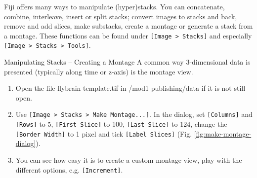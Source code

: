 Fiji offers many ways to manipulate (hyper)stacks. You can concatenate, combine, interleave, insert or split stacks; convert images to stacks and back, remove and add slices, make substacks, create a montage or generate a stack from a montage. These functions can be found under \texttt{[Image > Stacks]} and especially \texttt{[Image > Stacks > Tools]}. 

\begin{taskbox}{Manipulating Stacks -- Creating a Montage}
A common way 3-dimensional data is presented (typically along time or z-axis) is the montage view.

\begin{enumerate}
	\item Open the file flybrain-template.tif in /mod1-publishing/data if it is not still open.
	\item Use \texttt{[Image > Stacks > Make Montage...]}. In the dialog, set \texttt{[Columns]} and \texttt{[Rows]} to 5, \texttt{[First Slice]} to 100, \texttt{[Last Slice]} to 124, change the \texttt{[Border Width]} to 1 pixel and tick \texttt{[Label Slices]} (Fig. \ref{fig:make-montage-dialog}).
	
	\begin{minipage}[t]{\linewidth}
		\begin{center}
		\medskip
		\label{fig:make-montage-dialog}
		\end{center}
	\end{minipage}
	
	\item You can see how easy it is to create a custom montage view, play with the different options, e.g. \texttt{[Increment]}.
\end{enumerate}

\end{taskbox}

